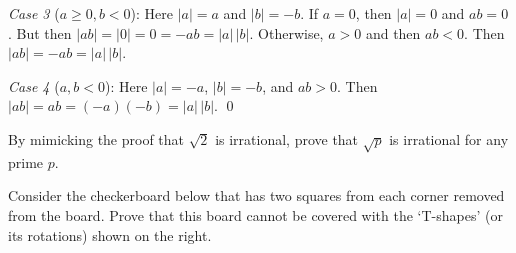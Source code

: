 \documentclass[11pt,letterpaper]{article}
\begin{document}
\textit{Case 3} ($a \geq 0, b < 0$): Here $|a|= a$ and $|b|= -b$. If $a= 0$, then $|a|= 0$ and $ab= 0$. But then $|ab|= |0|= 0= -ab= |a| \, |b|$. Otherwise, $a > 0$ and then $ab < 0$. Then $|ab|= -ab= |a| \, |b|$. 

\textit{Case 4} ($a, b < 0$): Here $|a|= -a$, $|b|= -b$, and $ab > 0$. Then $|ab|= ab= (-a)(-b)= |a| \, |b|$. \qed \pspace





\newpage





 By mimicking the proof that $\sqrt{2}$ is irrational, prove that $\sqrt{p}$ is irrational for any prime $p$. \pspace





\newpage





 Consider the checkerboard below that has two squares from each corner removed from the board. Prove that this board cannot be covered with the `T-shapes' (or its rotations) shown on the right. \pspace

\drawboard
\end{document}
